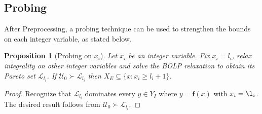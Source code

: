 \documentclass[11.5pt]{article}
\newtheorem{prop}{Proposition}
\newcommand{\dom}{\succ}
\renewcommand{\P}{\mathbb{P}}
\newcommand{\U}{\mathcal{U}}
\newcommand{\N}{\mathcal{N}}
\newcommand{\objf}{\boldsymbol{f}}
\begin{document}
%
%

\subsection{Probing} \label{sec:probe}
After Preprocessing, a probing technique can be used to strengthen the bounds on each integer variable, as stated below. %

\begin{prop}[Probing on $x_{i}$]\label{probe}
Let $x_{i}$ be an integer variable. Fix $x_i = l_i$, relax integrality on other integer variables and solve the BOLP relaxation to obtain its Pareto set $\mathcal{L}_{l_i}$. If $\U_0 \dom \mathcal{L}_{l_i}$ then $X_{E}\subseteq\{x\colon x_{i}\ge l_{i}+1 \}$. %
\end{prop}
\begin{proof}
Recognize that $\mathcal{L}_{l_i}$ dominates every $y \in Y_I$ where $y = \objf(x)$ with $x_i = \l_i$. The desired result follows from $\U_0 \dom \mathcal{L}_{l_i}$.
\end{proof}
\end{document}
